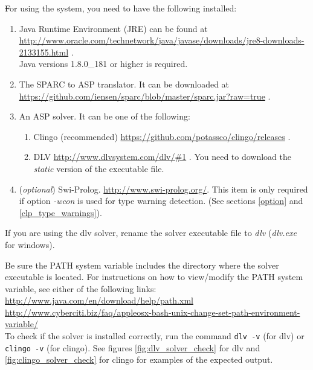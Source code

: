 \documentclass[12pt, letterpaper]{article}
\begin{document}
\st For using the system, you need to have the following installed:
\begin{enumerate}
\item Java Runtime Environment (JRE) can be found at \\
{\scriptsize
\url{http://www.oracle.com/technetwork/java/javase/downloads/jre8-downloads-2133155.html}
}.\\
Java versions 1.8.0\_181 or higher is required.
\item The SPARC to ASP translator. It can be downloaded at \\ 
{\scriptsize
\url{https://github.com/iensen/sparc/blob/master/sparc.jar?raw=true}
}.
\item An ASP solver. It can be one of the following:
  \begin{enumerate}
  \item Clingo (recommended)  {\scriptsize
 \url{https://github.com/potassco/clingo/releases}
}.
\item DLV
{\scriptsize
 \url{http://www.dlvsystem.com/dlv/#1}
}. You need to download the \textit{static} version of the executable file.

\end{enumerate}

\item (\textit{optional}) Swi-Prolog. {\scriptsize \url{http://www.swi-prolog.org/}}. This item is only required if option \textit{-wcon} is used for type warning detection.
(See sections \ref{option} and \ref{clp_type_warnings}).

\end{enumerate}
If you are using the dlv solver, rename the solver executable file to \textit{dlv} (\textit{dlv.exe} for windows).

Be sure the PATH system variable includes the directory where the solver executable is located. For instructions on how to view/modify the PATH system variable, see either of the following links:\\
{\scriptsize
\url{http://www.java.com/en/download/help/path.xml}\\
\url{http://www.cyberciti.biz/faq/appleosx-bash-unix-change-set-path-environment-variable/}\\
}
To check if the solver is installed correctly, run the command \texttt{dlv -v} (for dlv) or \\ \texttt{clingo -v} (for clingo). See figures \ref{fig:dlv_solver_check} for dlv and \ref{fig:clingo_solver_check} for clingo for examples of the expected output.
\end{document}
